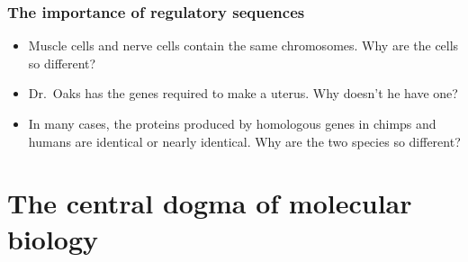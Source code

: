 \begin{frame}[t]
    \frametitle{The importance of regulatory sequences}
    \begin{adjustwidth}{-1.5em}{-1.5em}
    \begin{itemize}
        \item Muscle cells and nerve cells contain the same chromosomes. Why
            are the cells so different?


        \item Dr.\ Oaks has the genes required to make a uterus. Why doesn't he
            have one?


        \item In many cases, the proteins produced by homologous genes in
            chimps and humans are identical or nearly identical. Why are the
            two species so different?

    \end{itemize}
    \end{adjustwidth}
\end{frame}

\section{The central dogma of molecular biology}


